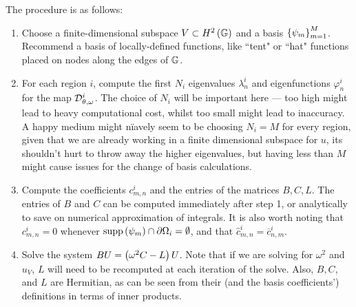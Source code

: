\documentclass[11pt]{report}
\newcommand{\DtN}{\mathcal{D}}
\newcommand{\di}{\DtN_{\qm, \omega}^i}
\newcommand{\gradgradSob}[1]{H^2\bracs{#1}}
\begin{document}
The procedure is as follows:
\begin{enumerate}
	\item Choose a finite-dimensional subspace $V\subset\gradgradSob{\graph}$ and a basis $\left\{ \psi_m \right\}_{m=1}^M$.
	Recommend a basis of locally-defined functions, like ``tent" or ``hat" functions placed on nodes along the edges of $\mathbb{G}$.
	\item For each region $i$, compute the first $N_i$ eigenvalues $\lambda_n^i$ and eigenfunctions $\varphi_n^i$ for the map $\di$.
	The choice of $N_i$ will be important here --- too high might lead to heavy computational cost, whilst too small might lead to inaccuracy.
	A happy medium might n\"iavely seem to be choosing $N_i = M$ for every region, given that we are already working in a finite dimensional subspace for $u$, its shouldn't hurt to throw away the higher eigenvalues, but having less than $M$ might cause issues for the change of basis calculations.
	\item Compute the coefficients $c_{m,n}^i$ and the entries of the matrices $B, C, L$.
	The entries of $B$ and $C$ can be computed immediately after step 1, or analytically to save on numerical approximation of integrals.
	It is also worth noting that $c_{m,n}^i=0$ whenever $\mathrm{supp}\left( \psi_m \right)\cap\partial\Omega_i = \emptyset$, and that $\hat{c}_{m,n}^i=\overline{c}_{n,m}^i$.
	\item Solve the system $B U = \left( \omega^2 C - L \right) U$.
	Note that if we are solving for $\omega^2$ and $u_V$, $L$ will need to be recomputed at each iteration of the solve.
	Also, $B, C$, and $L$ are Hermitian, as can be seen from their (and the basis coefficients') definitions in terms of inner products.
\end{enumerate}
\end{document}
